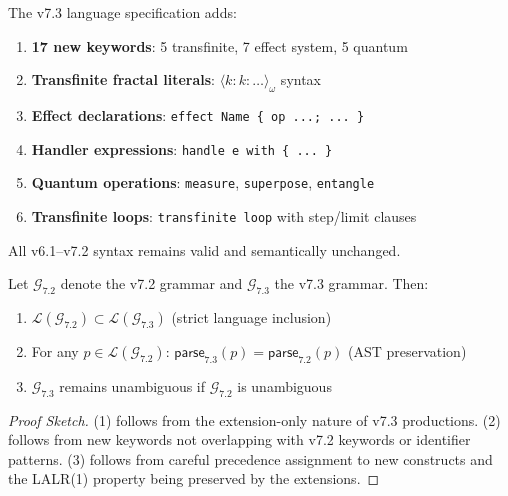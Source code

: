 \begin{definition}
\label{def:v73-summary}
The v7.3 language specification adds:
\begin{enumerate}
  \item \textbf{17 new keywords}: 5 transfinite, 7 effect system, 5 quantum
  \item \textbf{Transfinite fractal literals}: $\langle k : k : \ldots \rangle_\omega$ syntax
  \item \textbf{Effect declarations}: \texttt{effect Name \{ op ...; ... \}}
  \item \textbf{Handler expressions}: \texttt{handle e with \{ ... \}}
  \item \textbf{Quantum operations}: \texttt{measure}, \texttt{superpose}, \texttt{entangle}
  \item \textbf{Transfinite loops}: \texttt{transfinite loop} with step/limit clauses
\end{enumerate}
All v6.1--v7.2 syntax remains valid and semantically unchanged.
\end{definition}

\begin{theorem}
\label{thm:grammar-conservative}
Let $\mathcal{G}_{7.2}$ denote the v7.2 grammar and $\mathcal{G}_{7.3}$ the v7.3 grammar. Then:
\begin{enumerate}
  \item $\mathcal{L}(\mathcal{G}_{7.2}) \subset \mathcal{L}(\mathcal{G}_{7.3})$ (strict language inclusion)
  \item For any $p \in \mathcal{L}(\mathcal{G}_{7.2})$: $\mathsf{parse}_{7.3}(p) = \mathsf{parse}_{7.2}(p)$ (AST preservation)
  \item $\mathcal{G}_{7.3}$ remains unambiguous if $\mathcal{G}_{7.2}$ is unambiguous
\end{enumerate}
\end{theorem}

\begin{proof}[Proof Sketch]
(1) follows from the extension-only nature of v7.3 productions. (2) follows from new keywords not overlapping with v7.2 keywords or identifier patterns. (3) follows from careful precedence assignment to new constructs and the LALR(1) property being preserved by the extensions.
\end{proof}

